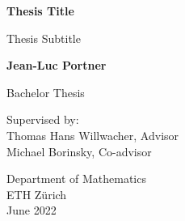 \begin{titlepage}
   \begin{center}
       \vspace*{4cm}

       \textbf{Thesis Title}

       \vspace{0.5cm}
        Thesis Subtitle
            
       \vspace{1.5cm}

       \textbf{Jean-Luc Portner}

	   \vspace{0.8cm}
            
       Bachelor Thesis
       
       \vspace{0.5cm}
       
       Supervised by:\\
	   Thomas Hans Willwacher, Advisor\\
	   Michael Borinsky, Co-advisor
            
       \vfill
     
       Department of Mathematics\\
       ETH Zürich\\
       June 2022
            
   \end{center}
\end{titlepage}
